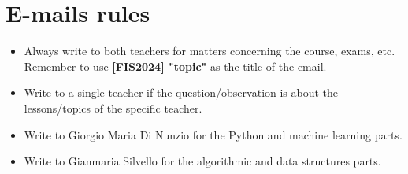 \chapter{E-mails rules}
    \begin{itemize}
        \item Always write to both teachers for matters concerning the course, exams, etc. Remember to use \textbf{[FIS2024] "topic"} as the title of the email.
        \item Write to a single teacher if the question/observation is about the lessons/topics of the specific teacher.
        \item Write to Giorgio Maria Di Nunzio for the Python and machine learning parts.
        \item Write to Gianmaria Silvello for the algorithmic and data structures parts.
    \end{itemize}